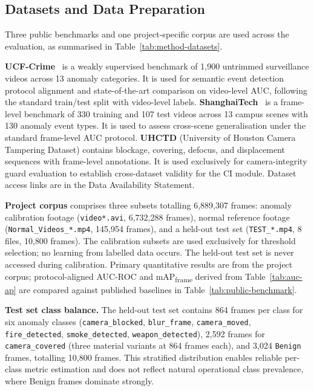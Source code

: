 \documentclass[a4paper,fleqn]{cas-dc}
\begin{document}
\FloatBarrier
\subsection{Datasets and Data Preparation}
 
Three public benchmarks and one project-specific corpus are used across the evaluation, as summarised in Table~\ref{tab:method-datasets}.
 
\textbf{UCF-Crime}~\citep{sultani2018realworld} is a weakly supervised benchmark of 1,900 untrimmed surveillance videos across 13 anomaly categories. It is used for semantic event detection protocol alignment and state-of-the-art comparison on video-level AUC, following the standard train/test split with video-level labels. \textbf{ShanghaiTech}~\citep{georgescu2021anomaly} is a frame-level benchmark of 330 training and 107 test videos across 13 campus scenes with 130 anomaly event types. It is used to assess cross-scene generalisation under the standard frame-level AUC protocol. \textbf{UHCTD} (University of Houston Camera Tampering Dataset) contains blockage, covering, defocus, and displacement sequences with frame-level annotations. It is used exclusively for camera-integrity guard evaluation to establish cross-dataset validity for the CI module. Dataset access links are in the Data Availability Statement.
 
\textbf{Project corpus} comprises three subsets totalling 6{,}889{,}307 frames: anomaly calibration footage (\texttt{video*.avi}, 6{,}732{,}288 frames), normal reference footage (\texttt{Normal\_Videos\_*.mp4}, 145{,}954 frames), and a held-out test set (\texttt{TEST\_*.mp4}, 8 files, 10{,}800 frames). The calibration subsets are used exclusively for threshold selection; no learning from labelled data occurs. The held-out test set is never accessed during calibration. Primary quantitative results are from the project corpus; protocol-aligned AUC-ROC and mAP\textsubscript{frame} derived from Table~\ref{tab:auc-ap} are compared against published baselines in Table~\ref{tab:public-benchmark}.
 
\textbf{Test set class balance.} The held-out test set contains 864 frames per class for six anomaly classes (\texttt{camera\_blocked}, \texttt{blur\_frame}, \texttt{camera\_moved}, \texttt{fire\_detected}, \texttt{smoke\_detected}, \texttt{weapon\_detected}), 2{,}592 frames for \texttt{camera\_covered} (three material variants at 864 frames each), and 3{,}024 \texttt{Benign} frames, totalling 10{,}800 frames. This stratified distribution enables reliable per-class metric estimation and does not reflect natural operational class prevalence, where Benign frames dominate strongly.
 
\end{document}
